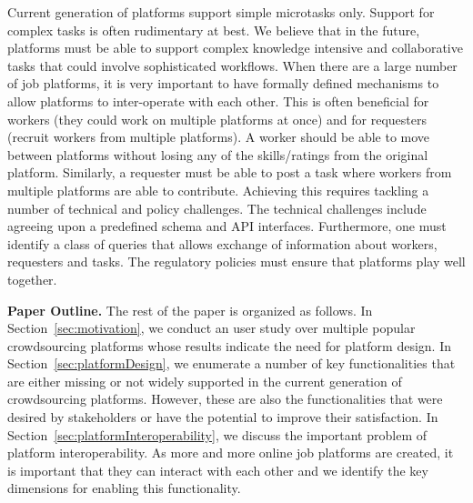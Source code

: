 Current generation of platforms support simple microtasks only.
Support for complex tasks is often rudimentary at best.
We believe that in the future, platforms must be able to support complex knowledge intensive and
collaborative tasks that could involve sophisticated workflows.
When there are a large number of job platforms, it is very important to have formally defined mechanisms to
allow platforms to inter-operate with each other.
This is often beneficial for workers (they could work on multiple platforms at once)
and for requesters (recruit workers from multiple platforms).
A worker should be able to move between platforms without losing
any of the skills/ratings from the original platform.
Similarly, a requester must be able to post a task where workers from multiple platforms are able to contribute.
Achieving this requires tackling a number of technical and policy challenges.
The technical challenges include agreeing upon a predefined schema and API interfaces.
Furthermore, one must identify a class of queries
that allows exchange of information about workers, requesters and tasks.
The regulatory policies must ensure that platforms play well together.


\textbf{Paper Outline.}
The rest of the paper is organized as follows.
In Section~\ref{sec:motivation}, we conduct an user study over multiple popular crowdsourcing platforms
whose results indicate the need for platform design.
In Section~\ref{sec:platformDesign}, we enumerate a number of key functionalities that are either missing or not widely supported in the current generation of crowdsourcing platforms.
However, these are also the functionalities that were desired by stakeholders or have the potential to improve their satisfaction.
In Section~\ref{sec:platformInteroperability}, we discuss the important problem of platform interoperability.
As more and more online job platforms are created, it is important that they can interact with each other and we identify the key dimensions 
for enabling this functionality.